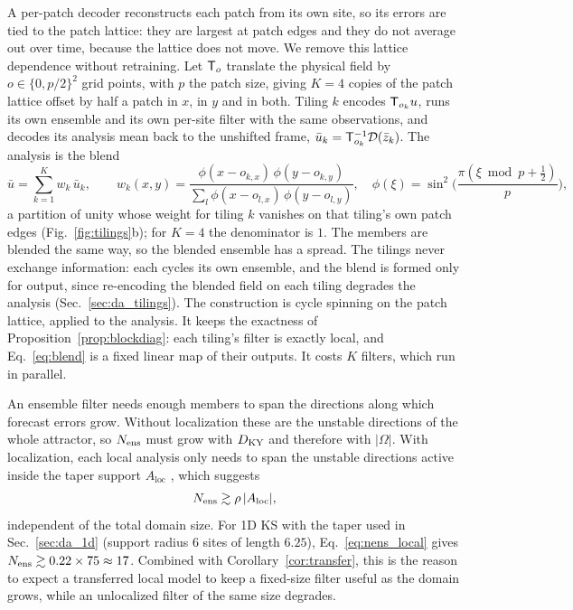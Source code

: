  A per-patch decoder reconstructs each patch from
its own site, so its errors are tied to the patch lattice: they are
largest at patch edges and they do not average out over time, because
the lattice does not move. We remove this lattice dependence without
retraining. Let $\mathsf{T}_o$ translate the physical field by
$o\in\{0,p/2\}^2$ grid points, with $p$ the patch size, giving $K=4$
copies of the patch lattice offset by half a patch in $x$, in $y$ and in
both. Tiling $k$ encodes $\mathsf{T}_{o_k}u$, runs its own ensemble and its own
per-site filter with the same observations, and decodes its analysis
mean back to the unshifted frame, $\bar u_k = \mathsf{T}_{o_k}^{-1}\mathcal{D}(\bar
z_k)$. The analysis is the blend
\begin{equation}
  \bar u = \sum_{k=1}^{K} w_k\,\bar u_k,\qquad
  w_k(x,y) = \frac{\phi(x-o_{k,x})\,\phi(y-o_{k,y})}
  {\sum_{l}\phi(x-o_{l,x})\,\phi(y-o_{l,y})},\quad
  \phi(\xi) = \sin^2\!\Big(\frac{\pi(\xi \bmod p + \tfrac12)}{p}\Big),
  \label{eq:blend}
\end{equation}
a partition of unity whose weight for tiling $k$ vanishes on that
tiling's own patch edges (Fig.~\ref{fig:tilings}b); for $K=4$ the
denominator is $1$. The members are blended the same way, so the blended
ensemble has a spread. The tilings never exchange information: each
cycles its own ensemble, and the blend is formed only for output, since
re-encoding the blended field on each tiling degrades the analysis
(Sec.~\ref{sec:da_tilings}). The construction is cycle spinning
\citep{coifmandonoho1995} on the patch lattice, applied to the
analysis. It keeps the exactness of Proposition~\ref{prop:blockdiag}:
each tiling's filter is exactly local, and Eq.~\eqref{eq:blend} is a
fixed linear map of their outputs. It costs $K$ filters, which run in
parallel.

An ensemble filter needs enough members to span the directions along
which forecast errors grow. Without localization these are the unstable
directions of the whole attractor, so $N_{\mathrm{ens}}$ must grow with $D_{\mathrm{KY}}$ and
therefore with $|\Omega|$. With localization, each local analysis only
needs to span the unstable directions active inside the taper support
$A_{\mathrm{loc}}$ \citep{patil2001,ott2004}, which suggests
\begin{equation}
  N_{\mathrm{ens}} \gtrsim \rho\,|A_{\mathrm{loc}}|,
  \label{eq:nens_local}
\end{equation}
independent of the total domain size. For 1D KS with the taper used in
Sec.~\ref{sec:da_1d} (support radius $6$ sites of length $6.25$),
Eq.~\eqref{eq:nens_local} gives $N_{\mathrm{ens}}\gtrsim 0.22\times75\approx17$.
Combined with Corollary~\ref{cor:transfer}, this is the reason to expect a
transferred local model to keep a fixed-size filter useful as the domain
grows, while an unlocalized filter of the same size degrades.

